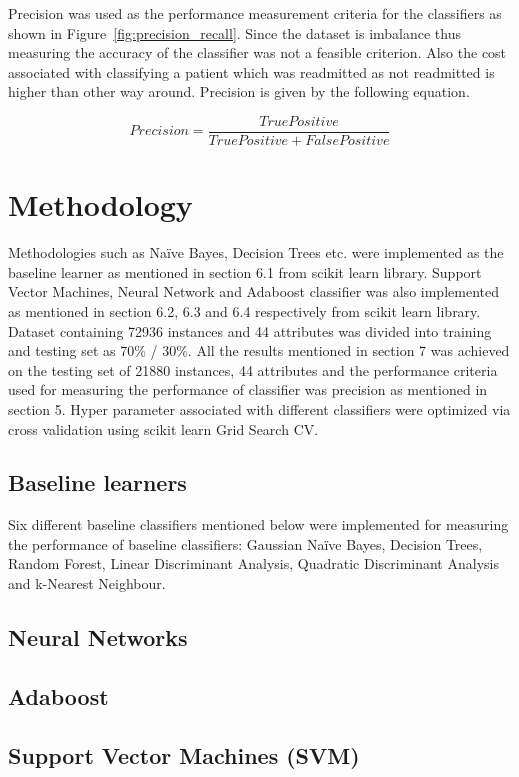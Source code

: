 \documentclass[conference]{IEEEtran}
\begin{document}
Precision was used as the performance measurement criteria for the classifiers as shown in Figure~\ref{fig:precision_recall}. Since the dataset is imbalance thus measuring the accuracy of the classifier was not a feasible criterion. Also the cost associated with classifying a patient which was readmitted as not readmitted is higher than other way around. Precision is given by the following equation.

\[ Precision = \frac{True Positive}{True Positive + False Positive} \]

\section{Methodology}

Methodologies such as Naïve Bayes, Decision Trees etc. were implemented as the baseline learner as mentioned in section 6.1 from scikit learn library. Support Vector Machines, Neural Network and Adaboost classifier was also implemented as mentioned in section 6.2, 6.3 and 6.4 respectively from scikit learn library. Dataset containing 72936 instances and 44 attributes was divided into training and testing set as 70\% / 30\%. All the results mentioned in section 7 was achieved on the testing set of 21880 instances, 44 attributes and the performance criteria used for measuring the performance of classifier was precision as mentioned in section 5. Hyper parameter associated with different classifiers were optimized via cross validation using scikit learn Grid Search CV.

\subsection{Baseline learners}

Six different baseline classifiers mentioned below were implemented for measuring the performance of baseline classifiers: Gaussian Naïve Bayes, Decision Trees, Random Forest, Linear Discriminant Analysis, Quadratic Discriminant Analysis and k-Nearest Neighbour.

\subsection{Neural Networks}

\subsection{Adaboost}

\subsection{Support Vector Machines (SVM)}
\end{document}
